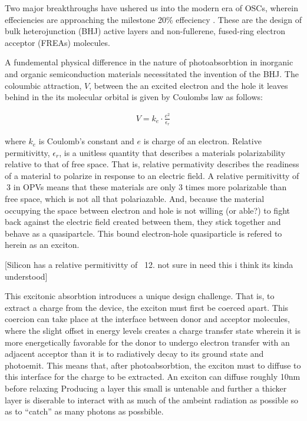 Two major breakthroughs have ushered us into the modern era of OSCs,
wherein effeciencies are approaching the milestone 20\% effeciency \cite{Liu2020b}.
These are the design of bulk heterojunction (BHJ) active layers and non-fullerene, fused-ring electron
acceptor (FREAs) molecules. 

A fundemental physical difference in the nature of photoabsorbtion in inorganic and organic semiconduction materials necessitated the
invention of the BHJ. The coloumbic attraction, $V$, between the an excited
electron and the hole it leaves behind in the its molecular orbital
is given by Coulombs law as follows:

\begin{align}
    V  =  k_{e} \cdot \frac{e^{2}}{\epsilon_{r}}
\end{align}

where $k_{e}$ is Coulomb's constant and $e$ is charge of an electron. Relative permitivitty,
$\epsilon_{r}$, is a unitless quantity that describes a materials polarizability relative
to that of free space. That is, relative
permativity describes the readiness of a material
to polarize in response to an electric field. A
relative permitivitty of $~3$ in OPVs means that these materials are only $3$ times more polarizable than free space, which
is not all that polariazable. And, because the material occupying the space between electron and hole
is not willing (or able?) to fight back against the electric field created between them, they stick together and behave as a quasipartcle. 
This bound electron-hole quasiparticle is refered to herein as an exciton.

[Silicon has a relative permitivitty of ~12. not sure in need this i think its kinda understood]

This excitonic absorbtion introduces a unique design challenge.
That is, to extract a charge from the device, the exciton
must first be coerced apart. This coercion can take place at the interface between donor and acceptor molecules,
where the slight offset in energy levels creates a charge transfer state wherein it is more
energetically favorable for the donor to undergo electron transfer with an adjacent acceptor than
it is to radiatively decay to its ground state and photoemit.
This means that, after photoabsorbtion, the exciton must to diffuse to this interface for the charge to be
extracted. An exciton can diffuse roughly 10nm before relaxing \cite{clarke2010} 
Producing a layer this small is untenable and further a thicker layer
is diserable to interact with as much of the ambeint radiation as possible so as to ``catch'' as many photons
as possbible. 

